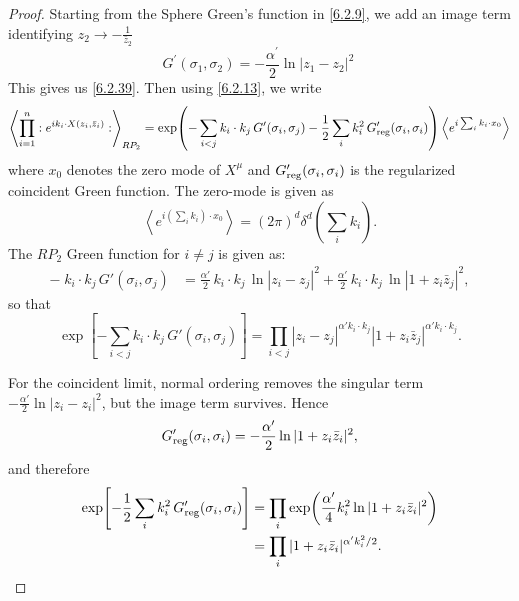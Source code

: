 \begin{tcolorbox}[breakable]
	\begin{proof}
		Starting from the Sphere Green's function in \eqref{6.2.9}, we  add an image term identifying $z_2\to-\frac{1}{\bar z_2}$
		\begin{equation}
			G^{\prime}(\sigma_{1}, \sigma_{2})=-\frac{\alpha^{\prime}}{2} \ln |z_{1}-z_{2}|^{2} \:
		\end{equation}
		This gives us \eqref{6.2.39}. Then using \eqref{6.2.13}, we write
		\begin{equation}
			\left\langle \prod_{i=1}^n :e^{i k_i\cdot X(z_i,\bar z_i)}: \right\rangle_{RP_2}
			=
			\exp\!\left(
			-\sum_{i<j} k_i\cdot k_j\, G'(\sigma_i,\sigma_j)
			-\frac12 \sum_i k_i^2\, G'_{\rm reg}(\sigma_i,\sigma_i)
			\right)\left\langle e^{i\sum_i k_i\cdot x_0}\right\rangle
		\end{equation}
		where $x_0$ denotes the zero mode of $X^\mu$ and $G'_{\rm reg}(\sigma_i,\sigma_i)$ is the regularized coincident Green function. The zero-mode is given as
		\begin{equation}
			\left\langle e^{i\left(\sum_i k_i\right)\cdot x_0}\right\rangle
			=(2\pi)^d \delta^d\!\left(\sum_i k_i\right).
		\end{equation}
		The $RP_2$ Green function for $i\neq j$ is given as:
		\begin{align}
			-\;k_i\cdot k_j\,G'(\sigma_i,\sigma_j)
			&=
			\frac{\alpha'}{2}\,k_i\cdot k_j\,\ln|z_i-z_j|^2
			+\frac{\alpha'}{2}\,k_i\cdot k_j\,\ln|1+z_i\bar z_j|^2 ,
		\end{align}
		so that
		\begin{equation}
			\exp\!\left[-\sum_{i<j} k_i\cdot k_j\,G'(\sigma_i,\sigma_j)\right]
			=
			\prod_{i<j}
			|z_i-z_j|^{\alpha' k_i\cdot k_j}
			|1+z_i\bar z_j|^{\alpha' k_i\cdot k_j}.
		\end{equation}
		
		For the coincident limit, normal ordering removes the singular term
		$-\frac{\alpha'}{2}\ln|z_i-z_i|^2$, but the image term survives. Hence
		\begin{equation}
			G'_{\rm reg}(\sigma_i,\sigma_i)
			=
			-\frac{\alpha'}{2}\ln|1+z_i\bar z_i|^2,
		\end{equation}
		and therefore
		\begin{align}
			\exp\!\left[-\frac12 \sum_i k_i^2\,G'_{\rm reg}(\sigma_i,\sigma_i)\right]
			&=
			\prod_i
			\exp\!\left(\frac{\alpha'}{4}k_i^2\ln|1+z_i\bar z_i|^2\right) \\
			&=
			\prod_i |1+z_i\bar z_i|^{\alpha' k_i^2/2}.
		\end{align}
		

\end{proof}
\end{tcolorbox}
